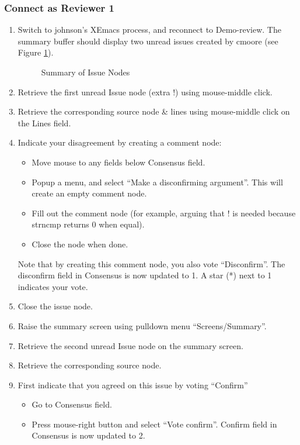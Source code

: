 \subsubsection {Connect as Reviewer 1}
\begin{enumerate}
\item Switch to johnson's XEmacs process, and reconnect to
Demo-review. The summary buffer should display two unread issues
created by cmoore (see Figure \ref{summary-issues}).
\begin{figure}[htb]
  {\centerline{}}
  \caption{Summary of Issue Nodes}
  \label{summary-issues}
\end{figure}

\item Retrieve the first unread Issue node (extra !) using
mouse-middle click. 
\item Retrieve the corresponding source node \& lines using
mouse-middle click on the Lines field.
\item Indicate your disagreement by creating a comment node:
   \begin{itemize}
   \item Move mouse to any fields below Consensus field.
   \item Popup a menu, and select ``Make a disconfirming
   argument''. This will create an empty comment node.
   \item Fill out the comment node (for example, arguing that ! is
   needed because strncmp returns 0 when equal).
   \item Close the node when done. 
   \end{itemize}
  Note that by creating this comment node, you also vote
  ``Disconfirm''. The disconfirm field in Consensus is now updated to
  1. A star (*) next to 1 indicates your vote. 
\item Close the issue node.
\item Raise the summary screen using pulldown menu ``Screens/Summary''.
\item Retrieve the second unread Issue node on the summary screen.
\item Retrieve the corresponding source node.
\item First indicate that you agreed on this issue by voting
``Confirm''
  \begin{itemize}
    \item Go to Consensus field.
    \item Press mouse-right button and  select ``Vote
    confirm''. Confirm field in Consensus is now updated to 2. 

\end{itemize}
\end{enumerate}
